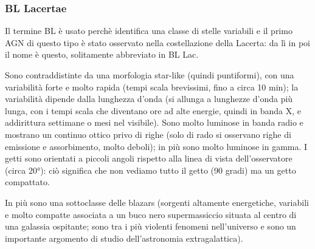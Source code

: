 \subsubsection{BL Lacertae} 
Il termine BL è usato perchè identifica una classe di stelle variabili e il primo AGN di questo tipo è stato osservato nella costellazione della Lacerta: da lì in poi il nome è questo, solitamente abbreviato in BL Lac. 

Sono contraddistinte da una morfologia star-like (quindi puntiformi), con una variabilità forte e molto rapida (tempi scala brevissimi, fino a circa 10 min); la variabilità dipende dalla lunghezza d’onda (si allunga a lunghezze d’onda più lunga, con i tempi scala che diventano ore ad alte energie, quindi in banda X, e addirittura settimane o mesi nel visibile). Sono molto luminose in banda radio e mostrano un continuo ottico privo di righe (solo di rado si osservano righe di emissione e assorbimento, molto deboli); in più sono molto luminose in gamma. I getti sono orientati a piccoli angoli rispetto alla linea di vista dell’osservatore (circa 20°): ciò significa che non vediamo tutto il getto (90 gradi) ma un getto compattato.

In più sono una sottoclasse delle blazars (sorgenti altamente energetiche, variabili e molto compatte associata a un buco nero supermassiccio situata al centro di una galassia ospitante; sono tra i più violenti fenomeni nell'universo e sono un importante argomento di studio dell'astronomia extragalattica).